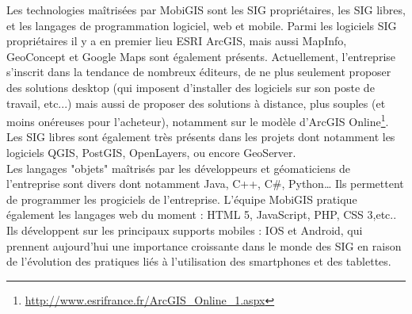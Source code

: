 Les technologies maîtrisées par MobiGIS sont les SIG propriétaires, les SIG libres, et les langages de programmation logiciel, web et mobile. Parmi les logiciels SIG propriétaires il y a en premier lieu ESRI ArcGIS, mais aussi MapInfo, GeoConcept et Google Maps sont également présents. Actuellement, l’entreprise s’inscrit dans la tendance de nombreux éditeurs, de ne plus seulement proposer des solutions desktop (qui imposent d’installer des logiciels sur son poste de travail, etc...) mais aussi de proposer des solutions à distance, plus souples (et moins onéreuses pour l’acheteur), notamment sur le modèle d’ArcGIS Online\footnote{\url{http://www.esrifrance.fr/ArcGIS_Online_1.aspx}}. Les SIG libres sont également très présents dans les projets dont notamment les logiciels QGIS, PostGIS, OpenLayers, ou encore GeoServer. \\

Les langages "objets" maîtrisés par les développeurs et géomaticiens de l’entreprise sont divers dont notamment Java, C++, C#, Python… Ils permettent de programmer les progiciels de l’entreprise. L’équipe MobiGIS pratique également les langages web du moment : HTML 5, JavaScript, PHP, CSS 3,etc.. Ils développent sur les principaux supports mobiles : IOS et Android, qui prennent aujourd'hui une importance croissante dans le monde des SIG en raison de l’évolution des pratiques liés à l'utilisation des smartphones et des tablettes. \\